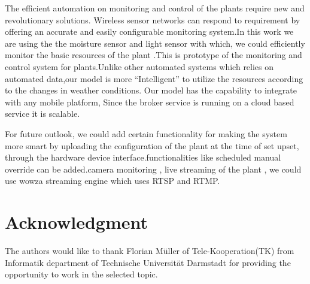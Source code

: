 \documentclass[10pt]{article}
\begin{document}
The efficient automation on monitoring and control of the plants require new and revolutionary solutions. Wireless sensor networks can respond to requirement by offering an accurate and easily configurable monitoring system.In this work we are using the the moisture sensor and light sensor with which, we could efficiently monitor the basic resources of the plant .This is prototype of the monitoring and control system for plants.Unlike other automated systems which relies on automated data,our model is more “Intelligent” to utilize the resources according to the changes in weather conditions. Our model has the capability to integrate with any mobile platform, Since the broker service is running on a cloud based service it is scalable.

For future outlook, we could add certain functionality for making the system more smart by uploading the configuration of the plant at the time of set upset, through the hardware device interface.functionalities like scheduled manual override can be added.camera monitoring , live streaming of the plant , we could use wowza streaming engine which uses RTSP and RTMP.

\section*{Acknowledgment}

The authors would like to thank Florian Müller of Tele-Kooperation(TK) from Informatik department of Technische Universität Darmstadt for providing the opportunity to work in the selected topic.
\end{document}
